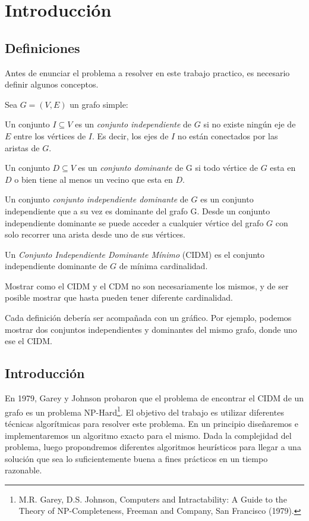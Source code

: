 \section{Introducción}

\subsection{Definiciones}

Antes de enunciar el problema a resolver en este trabajo practico, es necesario definir algunos conceptos.

Sea $G = (V,E)$ un grafo simple:
\begin{definition}
Un conjunto $I \subseteq V$ es un \textit{conjunto independiente} de $G$ si no existe ningún eje de $E$ entre los vértices de $I$. Es decir, los ejes de $I$ no están conectados por las aristas de $G$.
\end{definition}

\begin{definition}
Un conjunto $D \subseteq V$ es un \textit{conjunto dominante} de G si todo vértice de $G$ esta en $D$ o bien tiene al menos un vecino que esta en $D$.
\end{definition}

\begin{definition}
Un conjunto \textit{conjunto independiente dominante} de $G$ es un conjunto independiente que a su vez es dominante del grafo G. Desde un conjunto independiente dominante se puede acceder a cualquier vértice del grafo $G$ con solo recorrer una arista desde uno de sus vértices.
\end{definition}

\begin{definition}
Un \textit{Conjunto Independiente Dominante Mínimo} (CIDM) es el conjunto independiente dominante de $G$ de mínima cardinalidad.
\end{definition}

Mostrar como el CIDM y el CDM no son necesariamente los mismos, y de ser posible mostrar que hasta pueden tener diferente cardinalidad.

Cada definición debería ser acompañada con un gráfico. Por ejemplo, podemos mostrar dos conjuntos independientes y dominantes del mismo grafo, donde uno ese el CIDM.

\subsection{Introducción}
En 1979, Garey y Johnson probaron que el problema de encontrar el CIDM de un grafo es un problema NP-Hard\footnote{M.R. Garey, D.S. Johnson, Computers and Intractability: A Guide to the Theory of NP-Completeness, Freeman and Company, San Francisco (1979).}.
El objetivo del trabajo es utilizar diferentes técnicas algorítmicas para resolver este problema. En un principio diseñaremos e implementaremos un algoritmo exacto para el mismo. Dada la complejidad del problema, luego propondremos diferentes algoritmos heurísticos para llegar a una solución que sea lo suficientemente buena a fines prácticos en un tiempo razonable.

